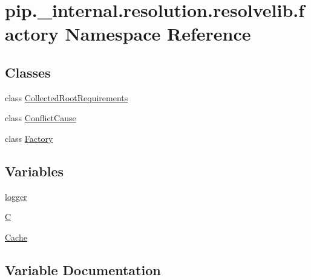 \hypertarget{namespacepip_1_1__internal_1_1resolution_1_1resolvelib_1_1factory}{}\section{pip.\+\_\+internal.\+resolution.\+resolvelib.\+factory Namespace Reference}
\label{namespacepip_1_1__internal_1_1resolution_1_1resolvelib_1_1factory}
\subsection*{Classes}
\begin{DoxyCompactItemize}
\item 
class \hyperlink{classpip_1_1__internal_1_1resolution_1_1resolvelib_1_1factory_1_1CollectedRootRequirements}{Collected\+Root\+Requirements}
\item 
class \hyperlink{classpip_1_1__internal_1_1resolution_1_1resolvelib_1_1factory_1_1ConflictCause}{Conflict\+Cause}
\item 
class \hyperlink{classpip_1_1__internal_1_1resolution_1_1resolvelib_1_1factory_1_1Factory}{Factory}
\end{DoxyCompactItemize}
\subsection*{Variables}
\begin{DoxyCompactItemize}
\item 
\hyperlink{namespacepip_1_1__internal_1_1resolution_1_1resolvelib_1_1factory_a94fcb9c91b24d26a9562785d8fc262fb}{logger}
\item 
\hyperlink{namespacepip_1_1__internal_1_1resolution_1_1resolvelib_1_1factory_af4f1b61dc9a6232b5cd03cc6917241bd}{C}
\item 
\hyperlink{namespacepip_1_1__internal_1_1resolution_1_1resolvelib_1_1factory_a7115c481d5463a00d9af88c2bac9b623}{Cache}
\end{DoxyCompactItemize}


\subsection{Variable Documentation}
\mbox{\label{namespacepip_1_1__internal_1_1resolution_1_1resolvelib_1_1factory_af4f1b61dc9a6232b5cd03cc6917241bd}} 
